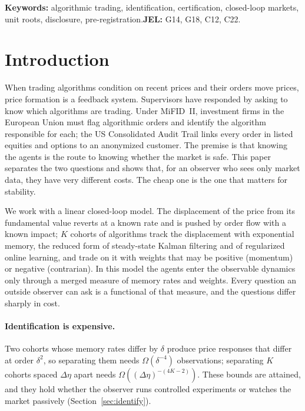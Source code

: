\documentclass[12pt]{article}
\theoremstyle{definition}
\theoremstyle{remark}
\begin{document}
\medskip\noindent\textbf{Keywords:} algorithmic trading, identification, certification, closed-loop markets, unit roots, disclosure, pre-registration.\quad\textbf{JEL:} G14, G18, C12, C22.

\newpage
\section{Introduction}\label{sec:intro}

When trading algorithms condition on recent prices and their orders move prices, price formation is a feedback system. Supervisors have responded by asking to know which algorithms are trading. Under MiFID~II, investment firms in the European Union must flag algorithmic orders and identify the algorithm responsible for each; the US Consolidated Audit Trail links every order in listed equities and options to an anonymized customer. The premise is that knowing the agents is the route to knowing whether the market is safe. This paper separates the two questions and shows that, for an observer who sees only market data, they have very different costs. The cheap one is the one that matters for stability.

We work with a linear closed-loop model. The displacement of the price from its fundamental value reverts at a known rate and is pushed by order flow with a known impact; $K$ cohorts of algorithms track the displacement with exponential memory, the reduced form of steady-state Kalman filtering and of regularized online learning, and trade on it with weights that may be positive (momentum) or negative (contrarian). In this model the agents enter the observable dynamics only through a merged measure of memory rates and weights. Every question an outside observer can ask is a functional of that measure, and the questions differ sharply in cost.

\paragraph{Identification is expensive.} Two cohorts whose memory rates differ by $\delta$ produce price responses that differ at order $\delta^2$, so separating them needs $\Omega(\delta^{-4})$ observations; separating $K$ cohorts spaced $\Delta\eta$ apart needs $\Omega((\Delta\eta)^{-(4K-2)})$. These bounds are attained, and they hold whether the observer runs controlled experiments or watches the market passively (Section~\ref{sec:identify}).
\end{document}
